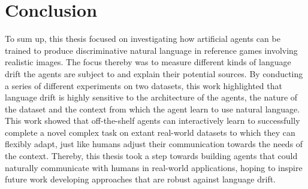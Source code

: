 \section{Conclusion}
To sum up, this thesis focused on investigating how artificial agents can be trained to produce discriminative natural language in reference games involving realistic images. The focus thereby was to measure different kinds of language drift the agents are subject to and explain their potential sources. By conducting a series of different experiments on two datasets, this work highlighted that language drift is highly sensitive to the architecture of the agents, the nature of the dataset and the context from which the agent learn to use natural language. This work showed that off-the-shelf agents can interactively learn to successfully complete a novel complex task on extant real-world datasets to which they can flexibly adapt, just like humans adjust their communication towards the needs of the context.
Thereby, this thesis took a step towards building agents that could naturally communicate with humans in real-world applications, hoping to inspire future work developing approaches that are robust against language drift.